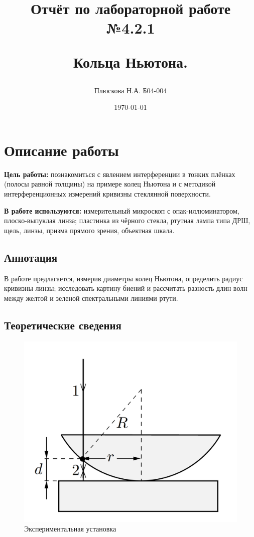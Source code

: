 \documentclass[a4paper,12pt]{report}
\title{Отчёт по лабораторной работе №4.2.1 

Кольца Ньютона.}
\author{Плюскова Н.А. Б04-004 }
\date{\today}
\begin{document}
\maketitle

\section*{\huge{Описание работы}}
\noindent\textbf{Цель работы:} познакомиться с явлением интерференции в тонких плёнках (полосы равной толщины) на примере колец Ньютона и с методикой интерференционных измерений кривизны стеклянной поверхности.

\noindent\textbf{В работе используются:} измерительный микроскоп с опак-иллюминатором, плоско-выпуклая линза; пластинка из чёрного стекла, ртутная лампа типа ДРШ, щель, линзы, призма прямого зрения, объектная шкала.

\subsection*{Аннотация}
В работе предлагается, измерив диаметры колец Ньютона, определить радиус кривизны линзы; исследовать картину биений и рассчитать разность длин волн между желтой и зеленой спектральными линиями ртути.

\subsection*{Теоретические сведения}

	\begin{figure} 
		\includegraphics[width=\linewidth]{ring}
		\caption{Экспериментальная установка}
		\label{ring}
	\end{figure}
\end{document}
